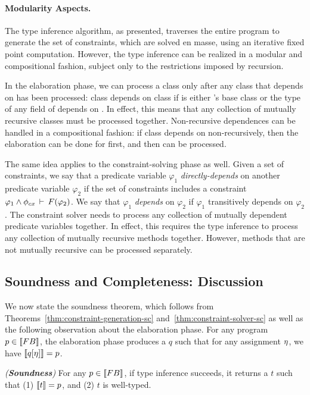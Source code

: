 \paragraph{Modularity Aspects.}
The type inference algorithm, as presented, traverses the entire program to
generate the set of constraints, which are solved en masse, using an iterative
fixed point computation. However, the type inference can be realized in a
modular and compositional fashion, subject only to the restrictions imposed
by recursion.

In the elaboration phase, we can process a class  only after any class
 that  depends on has been processed: class  depends on
class  if  is either 's base class or the type of any field
of  depends on . In effect, this means that any collection of
mutually recursive classes must be processed together. Non-recursive
dependences can be handled in a compositional fashion: if class 
depends on  non-recursively, then the elaboration can be done for
 first, and then  can be processed.

The same idea applies to the constraint-solving phase as well.
Given a set of constraints, we say that a predicate variable $\varphi_1$
\emph{directly-depends} on another predicate variable $\varphi_2$ if the set of
constraints includes a constraint $\varphi_1 \wedge \phi_{cx}\,\vdash\,F(\varphi_2)$.
We say that $\varphi_1$ \emph{depends} on $\varphi_2$ if $\varphi_1$ transitively
depends on $\varphi_2$.
The constraint solver needs to process any collection of mutually dependent
predicate variables together.
In effect, this requires the type inference to process any collection of
mutually recursive methods together.
However, methods that are not mutually recursive can be processed separately.

\subsection{Soundness and Completeness: Discussion}

We now state the soundness theorem, which follows from
Theorems~\ref{thm:constraint-generation-sc} and~\ref{thm:constraint-solver-sc}
as well as the following observation about the elaboration phase.
For any program $p \in \llbracket {\sc FB} \rrbracket$, the elaboration phase produces a $q$
such that for any assignment $\eta$, we have $\llbracket q[\eta] \rrbracket = p$.

\begin{theorem}
\emph{(\textbf{Soundness})}
For any $p \in \llbracket {\sc FB} \rrbracket$, if type inference succeeds, it returns a $t$ such that
(1) $\llbracket t \rrbracket = p$, and
(2) $t$ is well-typed.
\end{theorem}

